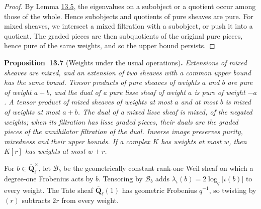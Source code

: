 \documentclass[11pt]{article}
\newenvironment{bpstatement}[2]{\par\addvspace{0.6\baselineskip}\noindent\textbf{#1}#2\textbf{.}\enspace\ignorespaces}
  {\par\addvspace{0.4\baselineskip}}
\newenvironment{bpstatementit}[2]{\begin{bpstatement}{#1}{#2}\itshape\ignorespaces}{\end{bpstatement}}
\begin{document}
\begin{proof}[{Proof}]\label{bp23}%
By Lemma \hyperref[bp19]{13.5}, the eigenvalues on a subobject or a quotient occur among those of the whole. Hence subobjects and quotients of pure sheaves are pure. For mixed sheaves, we intersect a mixed filtration with a subobject, or push it into a quotient. The graded pieces are then subquotients of the original pure pieces, hence pure of the same weights, and so the upper bound persists.
\end{proof}

\label{bp24}%
\begin{bpstatementit}{Proposition~13.7}{ (Weights under the usual operations)}
Extensions of mixed sheaves are mixed, and an extension of two sheaves with a common upper bound has the same bound.  Tensor products of pure sheaves of weights \(a\) and \(b\) are pure of weight \(a+b\), and the dual of a pure lisse sheaf of weight \(a\) is pure of weight \(-a\). A tensor product of mixed sheaves of weights at most \(a\) and at most \(b\) is mixed of weights at most \(a+b\). The dual of a mixed lisse sheaf is mixed, of the negated weights; when its filtration has lisse graded pieces, their duals are the graded pieces of the annihilator filtration of the dual.  Inverse image preserves purity, mixedness and their upper bounds.  If a complex \(K\) has weights at most \(w\), then \(K[r]\) has weights at most \(w+r\).

For \(b\in\overline{\mathbf Q}_\ell^\times\), let \(\mathcal B_b\) be the geometrically constant rank-one Weil sheaf on which a degree-one Frobenius acts by \(b\). Tensoring by \(\mathcal B_b\) adds \(\lambda_\iota(b)=2\log_q|\iota(b)|\) to every weight.  The Tate sheaf \(\overline{\mathbf Q}_\ell(1)\) has geometric Frobenius \(q^{-1}\), so twisting by \((r)\) subtracts \(2r\) from every weight.
\end{bpstatementit}
\end{document}
